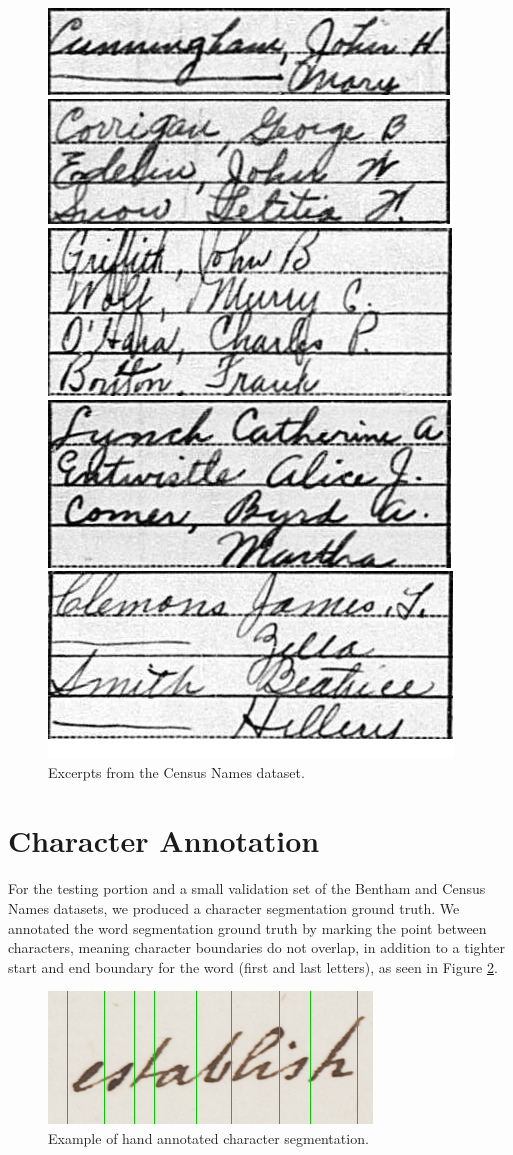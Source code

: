 \documentclass[ms,electronic,twosidetoc,letterpaper,chaptercenter,parttop,lol,lof,lot]{byumsphd}
\begin{document}
\begin{figure}
    \centering
    \includegraphics[width=.5\textwidth]{names_examples}
    \caption{Excerpts from the Census Names dataset.}
    \label{fig:NamesExamples}
\end{figure}

\section{Character Annotation}

For the testing portion and a small validation set of the Bentham and Census Names datasets, we produced a character segmentation ground truth. We annotated the word segmentation ground truth by marking the point between characters, meaning character boundaries do not overlap, in addition to a tighter start and end boundary for the word (first and last letters), as seen in Figure \ref{fig:charseg}.

\begin{figure}
    \centering
    \includegraphics[width=.5\textwidth]{charseg}
    \caption{Example of hand annotated character segmentation.}
    \label{fig:charseg}
\end{figure}
\end{document}
